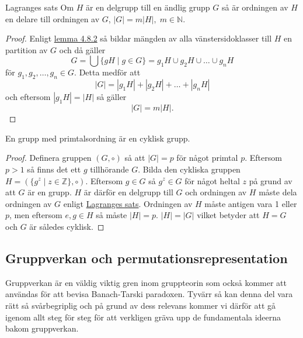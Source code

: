 \documentclass{article}
\theoremstyle{definition}
\begin{document}
\hypertarget{lag}{}
\begin{mytheo}{Lagranges sats}{}
  Om $H$ är en delgrupp till en ändlig grupp $G$ så är ordningen av $H$ en delare till ordningen av 
  $G$, 
  $|G| = m |H|, \; m \in \mathbb{N}$.
\end{mytheo}
\begin{proof}
  Enligt \hyperlink{lemma4.2}{lemma 4.8.2} så bildar mängden av alla vänstersidoklasser
  till $H$ en 
  partition av $G$ och då gäller
  \[G = \bigcup \{gH \; |\; g \in G\} = g_1H \cup g_2H \cup \ldots \cup g_nH\]
  för $g_1, g_2, \ldots, g_n \in G.$
  Detta medför att 
  \[|G| = |g_1H| + |g_2H| + \ldots + |g_nH|\]
  och eftersom $|g_1H| = |H|$ så gäller 
  \[|G| = m |H|.\]
\end{proof}
\begin{mykol}{}{}
  En grupp med primtalsordning är en cyklisk grupp.
\end{mykol}
\begin{proof}
  Definera gruppen $(G, \circ)$ så att $|G| = p$ för något primtal $p$. Eftersom 
  $p > 1$ så finns det ett $g$ tillhörande $G$. Bilda den cykliska gruppen 
  $H = (\{g^z \; | \; z \in \mathbb{Z}\}, \circ)$. Eftersom $g \in G$ så $g^z \in G$ 
  för något heltal $z$ på grund av att $G$ är en grupp. $H$ är därför en delgrupp till $G$ och 
  ordningen av $H$ måste dela ordningen av $G$ enligt \hyperlink{lag}{Lagranges sats}.
  Ordningen av $H$ måste antigen vara 1 eller $p$, men eftersom $e, g \in H$ så måste 
  $|H| = p$. $|H| = |G|$ vilket betyder att $H = G$ och $G$ är således cyklisk.
\end{proof}

\subsection{Gruppverkan och permutationsrepresentation}
Gruppverkan är en väldig viktig gren inom gruppteorin som också kommer att användas 
för att bevisa Banach-Tarski paradoxen. 
Tyvärr så kan denna del vara rätt så svårbegriplig och på grund av dess relevans 
kommer vi därför att gå igenom allt steg för steg för att verkligen gräva upp
de fundamentala ideerna bakom gruppverkan. 


\end{document}
